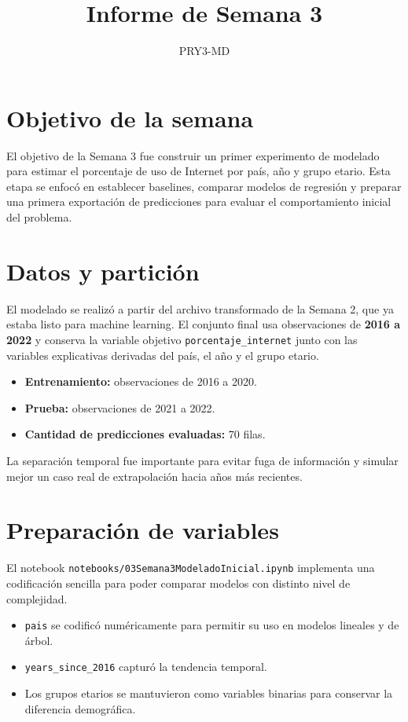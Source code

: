 \documentclass[12pt,a4paper]{article}
\title{Informe de Semana 3}
\author{PRY3-MD}
\date{}
\begin{document}
\maketitle

\section{Objetivo de la semana}

El objetivo de la Semana 3 fue construir un primer experimento de modelado para estimar el porcentaje de uso de Internet por país, año y grupo etario. Esta etapa se enfocó en establecer baselines, comparar modelos de regresión y preparar una primera exportación de predicciones para evaluar el comportamiento inicial del problema.

\section{Datos y partición}

El modelado se realizó a partir del archivo transformado de la Semana 2, que ya estaba listo para machine learning. El conjunto final usa observaciones de \textbf{2016 a 2022} y conserva la variable objetivo \texttt{porcentaje\_internet} junto con las variables explicativas derivadas del país, el año y el grupo etario.

\begin{itemize}
    \item \textbf{Entrenamiento:} observaciones de 2016 a 2020.
    \item \textbf{Prueba:} observaciones de 2021 a 2022.
    \item \textbf{Cantidad de predicciones evaluadas:} 70 filas.
\end{itemize}

La separación temporal fue importante para evitar fuga de información y simular mejor un caso real de extrapolación hacia años más recientes.

\section{Preparación de variables}

El notebook \texttt{notebooks/03Semana3ModeladoInicial.ipynb} implementa una codificación sencilla para poder comparar modelos con distinto nivel de complejidad.

\begin{itemize}
    \item \texttt{pais} se codificó numéricamente para permitir su uso en modelos lineales y de árbol.
    \item \texttt{years\_since\_2016} capturó la tendencia temporal.
    \item Los grupos etarios se mantuvieron como variables binarias para conservar la diferencia demográfica.
\end{itemize}
\end{document}
